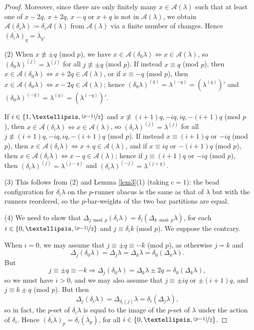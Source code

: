 \documentclass[10pt]{amsart}
\begin{document}
\begin{proof}
Moreover, since there are only finitely many $x\in\mathcal{A}(\lambda)$ such that at least one of $x-2q$, $x+2q$, $x-q$ or $x+q$ is not in $\mathcal{A}(\lambda)$, we obtain $\mathcal{A}(\delta_i\lambda)\coloneqq\delta_i\mathcal{A}(\lambda)$ from $\mathcal{A}(\lambda)$ via a finite number of changes. Hence $\overline{(\delta_i\lambda)}_q=\overline{\lambda}_q$. 

\smallskip
\noindent
(2) When $x\not\equiv\pm q$ (mod $p$), we have $x\in\mathcal{A}(\delta_0\lambda)\Leftrightarrow x\in\mathcal{A}(\lambda)$, so $(\delta_0\lambda)^{(j)}=\lambda^{(j)}$ for all $j\not\equiv\pm q$ (mod $p$). If instead $x\equiv q$ (mod $p$), then $x\in\mathcal{A}(\delta_0\lambda)\Leftrightarrow x+2q\in\mathcal{A}(\lambda)$, or if $x\equiv-q$ (mod $p$), then $x\in\mathcal{A}(\delta_0\lambda)\Leftrightarrow x-2q\in\mathcal{A}(\lambda)$; hence $(\delta_0\lambda)^{(q)}=\lambda^{(-q)}=(\lambda^{(q)})'$ and $(\delta_0\lambda)^{(-q)}=\lambda^{(q)}=(\lambda^{(-q)})'$. 

If $i\in\{1,\dots,\nicefrac{(p-1)}{2}\}$ and $x\not\equiv(i+1)q,-iq,iq,-(i+1)q$ (mod $p$), then $x\in\mathcal{A}(\delta_i\lambda)\Leftrightarrow x\in\mathcal{A}(\lambda)$, so $(\delta_i\lambda)^{(j)}=\lambda^{(j)}$ for all $j\not\equiv(i+1)q,-iq,iq,-(i+1)q$ (mod $p$). If instead $x\equiv(i+1)q$ or $-iq$ (mod $p$), then $x\in\mathcal{A}(\delta_i\lambda)\Leftrightarrow x+q\in\mathcal{A}(\lambda)$, and if $x\equiv iq$ or $-(i+1)q$ (mod $p$), then $x\in\mathcal{A}(\delta_i\lambda)\Leftrightarrow x-q\in\mathcal{A}(\lambda)$; hence if $j\equiv(i+1)q$ or $-iq$ (mod $p$), then $(\delta_i\lambda)^{(j)}=\lambda^{(j-q)}$ and $(\delta_i\lambda)^{(-j)}=\lambda^{(j+q)}$. 

\smallskip
\noindent
(3) This follows from (2) and Lemma \ref{lem3}(1) (taking $c=1$): the bead configuration for $\delta_i\lambda$ on the $p$-runner abacus is the same as that of $\lambda$ but with the runners reordered, so the $p$-bar-weights of the two bar partitions are equal. 

\smallskip
\noindent
(4) We need to show that $\Delta_{j\bmod p}(\delta_i\lambda)=\delta_i(\Delta_{k\bmod p}\lambda)$, for each $i\in\{0,\dots,\nicefrac{(p-1)}{2}\}$ and $j\equiv\delta_ik$ (mod $p$). We suppose the contrary. 

When $i=0$, we may assume that $j\equiv\pm q\equiv-k$ (mod $p$), as otherwise $j=k$ and 
$$\Delta_j(\delta_0\lambda)=\Delta_j\lambda=\Delta_k\lambda=\delta_0(\Delta_k\lambda).$$ 
But $$j\equiv\pm q\equiv-k\Rightarrow\Delta_j(\delta_0\lambda)=\Delta_k\lambda\pm2q=\delta_0(\Delta_k\lambda),$$ 
so we must have $i>0$, and we may also assume that $j\equiv\pm iq$ or $\pm(i+1)q$, and $j\equiv k\pm q$ (mod $p$). But then 
$$\Delta_j(\delta_i\lambda)=\Delta_{\delta_i(j)}\lambda=\delta_i(\Delta_j\lambda),$$ 
so in fact, the $p$-set of $\delta_i\lambda$ is equal to the image of the $p$-set of $\lambda$ under the action of $\delta_i$. Hence $\overline{(\delta_i\lambda)}_p=\delta_i(\overline{\lambda}_p)$, for all $i\in\{0,\dots,\nicefrac{(p-1)}{2}\}$. 
\end{proof}
\end{document}
